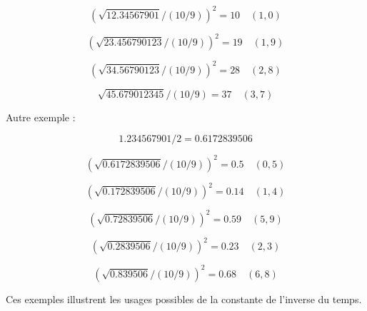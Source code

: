 \documentclass[11pt,a4paper]{article}
\begin{document}
\[
(\sqrt{12.34567901}/(10/9))^2 = 10 \quad (1,0)
\]





\[
(\sqrt{23.456790123}/(10/9))^2 = 19 \quad (1,9)
\]





\[
(\sqrt{34.56790123}/(10/9))^2 = 28 \quad (2,8)
\]





\[
\sqrt{45.679012345}/(10/9) = 37 \quad (3,7)
\]



Autre exemple :



\[
1.234567901/2 = 0.6172839506
\]





\[
(\sqrt{0.6172839506}/(10/9))^2 = 0.5 \quad (0,5)
\]





\[
(\sqrt{0.172839506}/(10/9))^2 = 0.14 \quad (1,4)
\]





\[
(\sqrt{0.72839506}/(10/9))^2 = 0.59 \quad (5,9)
\]





\[
(\sqrt{0.2839506}/(10/9))^2 = 0.23 \quad (2,3)
\]





\[
(\sqrt{0.839506}/(10/9))^2 = 0.68 \quad (6,8)
\]



Ces exemples illustrent les usages possibles de la constante de l’inverse du temps.
\end{document}
